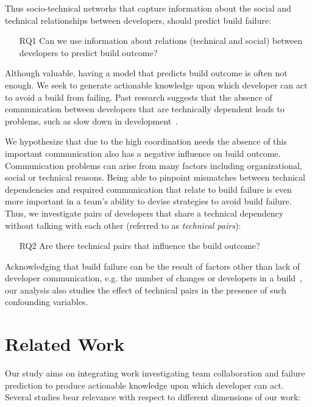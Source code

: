 \documentclass[12pt,oneside]{book}
\begin{document}
Thus
socio-technical networks that capture information about the social and technical
relationships between developers, should predict build failure:

\begin{itemize}
\item[RQ1] Can we use information about relations (technical and social) between
developers to predict build outcome?
\end{itemize}

Although valuable, having a model that predicts build outcome is often not
enough. We seek to generate actionable knowledge upon which developer can act to
avoid a build from failing. Past research suggests that the absence of
communication between developers that are technically dependent leads to
problems, such as slow down in development~\cite{cataldo:esem:2008}.


We hypothesize that due to the high coordination needs the absence of this
important communication also has a negative influence on build outcome. Communication problems can arise from many factors including organizational,
social or technical reasons. Being able to pinpoint
mismatches between technical dependencies and required communication that
relate to build failure is even more important in a team's
ability to devise strategies to avoid build failure. Thus, we
investigate pairs of developers that share a technical dependency without talking
with each other (referred to as \emph{technical pairs}):


\begin{itemize}
\item[RQ2] Are there technical pairs that influence the build outcome?
\end{itemize}

Acknowledging that build failure can be the result
of factors other than lack of developer
communication, e.g. the number of changes or developers in a build~\cite{hassan:ase:2006}, our
analysis also studies the effect of technical pairs in the presence of such
confounding variables. 







\section{Related Work}
\label{sec:relwork}
Our study aims on integrating work investigating team collaboration and failure prediction to produce actionable knowledge upon which developer can act.
Several studies bear relevance with respect to different dimensions of our work:
\end{document}
